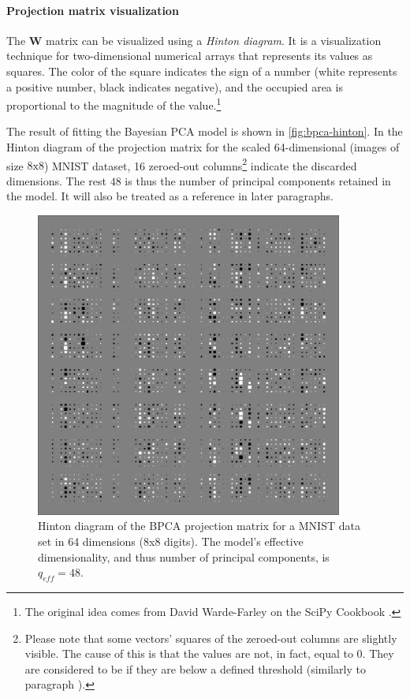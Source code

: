 \paragraph{Projection matrix visualization}
The $\mathbf{W}$ matrix can be visualized using a \textit{Hinton diagram}. It is a visualization technique for two-dimensional numerical arrays that represents its values as squares. The color of the square indicates the sign of a number (white represents a positive number, black indicates negative), and the occupied area is proportional to the magnitude of the value.\footnote{The original idea comes from David Warde-Farley on the SciPy Cookbook \cite{Virtanen2020}.}

\vspace{\baselineskip}
The result of fitting the Bayesian PCA model is shown in \autoref{fig:bpca-hinton}. In the Hinton diagram of the projection matrix for the scaled 64-dimensional (images of size $8\text{x}8$) MNIST dataset, 16 zeroed-out columns\footnote{Please note that some vectors' squares of the zeroed-out columns are slightly visible. The cause of this is that the values are not, in fact, equal to $0$. They are considered to be  if they are below a defined threshold (similarly to paragraph ).} indicate the discarded dimensions. The rest $48$ is thus the number of principal components retained in the model. It will also be treated as a reference in later paragraphs.

\begin{figure}[ht]
    \centering
    \includegraphics[width=0.9\textwidth]{observational/img/bpca/bpca_hinton_8.png}
    \caption[Hinton diagram of the BPCA projection matrix]{Hinton diagram of the BPCA projection matrix for a MNIST data set in 64 dimensions ($8$x$8$ digits). The model's effective dimensionality, and thus number of principal components, is $q_{eff} = 48$.}
    \label{fig:bpca-hinton}
\end{figure}

